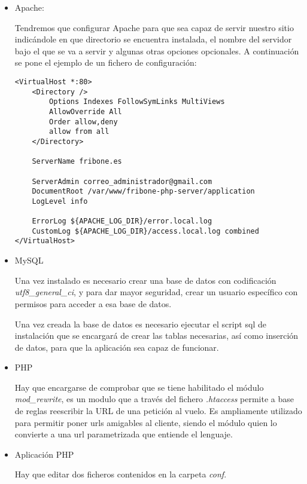     \begin{itemize}
        \item Apache:

            Tendremos que configurar Apache para que sea capaz de servir nuestro sitio indicándole en que directorio se encuentra instalada, el nombre del servidor bajo el que se va a servir y algunas otras opciones opcionales. A continuación se pone el ejemplo de un fichero de configuración:

                \begin{lstlisting}
<VirtualHost *:80>
    <Directory />
        Options Indexes FollowSymLinks MultiViews
        AllowOverride All
        Order allow,deny
        allow from all
    </Directory>

    ServerName fribone.es

    ServerAdmin correo_administrador@gmail.com
    DocumentRoot /var/www/fribone-php-server/application
    LogLevel info

    ErrorLog ${APACHE_LOG_DIR}/error.local.log
    CustomLog ${APACHE_LOG_DIR}/access.local.log combined
</VirtualHost>
                \end{lstlisting}

        \item MySQL

            Una vez instalado es necesario crear una base de datos con codificación \emph{utf8\_general\_ci}, y para dar mayor seguridad, crear un usuario específico con permisos para acceder a esa base de datos.

            Una vez creada la base de datos es necesario ejecutar el script sql de instalación que se encargará de crear las tablas necesarias, así como inserción de datos, para que la aplicación sea capaz de funcionar.

        \item PHP

            Hay que encargarse de comprobar que se tiene habilitado el módulo \emph{mod\_rewrite}, es un modulo que a través del fichero \emph{.htaccess} permite a base de reglas reescribir la URL de una petición al vuelo. Es ampliamente utilizado para permitir poner urls amigables al cliente, siendo el módulo quien lo convierte a una url parametrizada que entiende el lenguaje.

        \item Aplicación PHP

            Hay que editar dos ficheros contenidos en la carpeta \emph{conf}.


\end{itemize}
